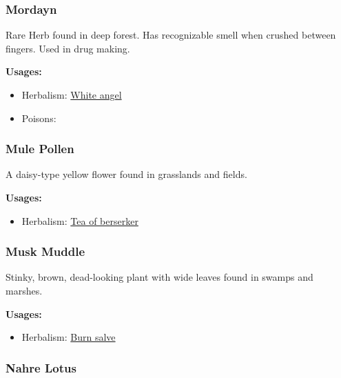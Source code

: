 \subsubsection{Mordayn}
\label{Mordayn}

Rare Herb found in deep forest. Has recognizable smell when crushed between fingers. Used in drug making.

\vspace{5mm}

\textbf{Usages:}

\begin{itemize}[noitemsep]
\item[] Herbalism: \hyperref[White angel]{White angel}
\item[] Poisons: \poison
\end{itemize}

\subsubsection{Mule Pollen}
\label{Mule Pollen}

A daisy-type yellow flower found in grasslands and fields.

\vspace{5mm}

\textbf{Usages:}

\begin{itemize}[noitemsep]
\item[] Herbalism: \hyperref[Tea of berserker]{Tea of berserker}
\end{itemize}

\subsubsection{Musk Muddle}
\label{Musk Muddle}

Stinky, brown, dead-looking plant with wide leaves found in swamps and marshes.

\vspace{5mm}

\textbf{Usages:}

\begin{itemize}[noitemsep]
\item[] Herbalism: \hyperref[Burn salve]{Burn salve}
\end{itemize}

\subsubsection{Nahre Lotus}
\label{Nahre Lotus}

